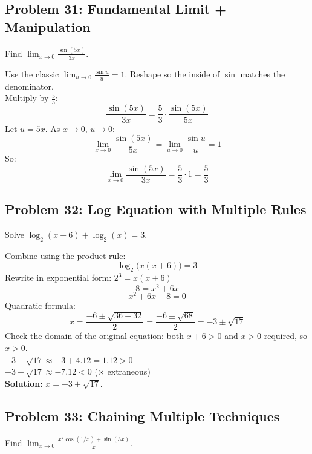 \documentclass[11pt, letterpaper]{article}
\begin{document}
\subsection*{Problem 31: Fundamental Limit + Manipulation}

Find $\displaystyle \lim_{x \to 0} \frac{\sin(5x)}{3x}$.

\begin{tcolorbox}[colback=examplebg, colframe=exampleborder,
  title={\bfseries Solution}, arc=3pt, boxrule=1pt]
Use the classic $\lim_{u \to 0} \frac{\sin u}{u} = 1$. Reshape so the inside of $\sin$ matches the denominator.\\[3pt]
Multiply by $\tfrac{5}{5}$:
\[
\frac{\sin(5x)}{3x} = \frac{5}{3} \cdot \frac{\sin(5x)}{5x}
\]
Let $u = 5x$. As $x \to 0$, $u \to 0$:
\[
\lim_{x \to 0} \frac{\sin(5x)}{5x} = \lim_{u \to 0} \frac{\sin u}{u} = 1
\]
So:
\[
\lim_{x \to 0} \frac{\sin(5x)}{3x} = \frac{5}{3} \cdot 1 = \frac{5}{3}
\]
\end{tcolorbox}

\subsection*{Problem 32: Log Equation with Multiple Rules}

Solve $\log_2(x + 6) + \log_2(x) = 3$.

\begin{tcolorbox}[colback=examplebg, colframe=exampleborder,
  title={\bfseries Solution}, arc=3pt, boxrule=1pt]
Combine using the product rule:
\[
\log_2\!\big(x(x + 6)\big) = 3
\]
Rewrite in exponential form: $2^3 = x(x + 6)$
\[
8 = x^2 + 6x
\]
\[
x^2 + 6x - 8 = 0
\]
Quadratic formula:
\[
x = \frac{-6 \pm \sqrt{36 + 32}}{2} = \frac{-6 \pm \sqrt{68}}{2} = -3 \pm \sqrt{17}
\]
Check the domain of the original equation: both $x + 6 > 0$ and $x > 0$ required, so $x > 0$.\\[3pt]
$-3 + \sqrt{17} \approx -3 + 4.12 = 1.12 > 0$ \; \checkmark\\
$-3 - \sqrt{17} \approx -7.12 < 0$ \; ($\times$ extraneous)\\[3pt]
\textbf{Solution:} $x = -3 + \sqrt{17}$.
\end{tcolorbox}

\subsection*{Problem 33: Chaining Multiple Techniques}

Find $\displaystyle \lim_{x \to 0} \frac{x^2 \cos(1/x) + \sin(3x)}{x}$.
\end{document}
